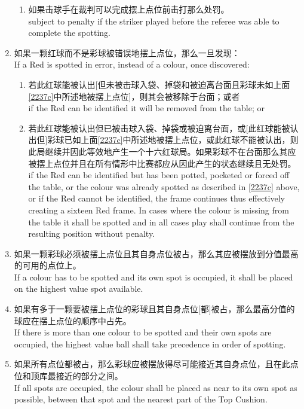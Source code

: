 \begin{enumerate}[label=(\alph*)]
\begin{enumerate}[label=(\roman*)]
        \item 如果击球手在裁判可以完成摆上点位前击打那么处罚。\\
        subject to penalty if the striker played before the referee was able to complete the spotting.
    \end{enumerate}
    \item 如果一颗红球而不是彩球被错误地摆上点位，那么一旦发现：\\
    If a Red is spotted in error, instead of a colour, once discovered:
    \begin{enumerate}[label=(\roman*)]
        \item 若此红球能被认出[但未被击球入袋、掉袋和被迫离台面且彩球未如上面\ref{2237c}中所述地被摆上点位]，则其会被移除于台面；或者\\
        if the Red can be identified it will be removed from the table; or
        \item 若此红球能被认出但已被击球入袋、掉袋或被迫离台面，或[此红球能被认出但]彩球已如上面\ref{2237c}中所述地被摆上点位，或此红球不能被认出，则此局继续并因此等效地产生一个十六红球局。如果彩球不在台面那么其应被摆上点位并且在所有情形中比赛都应从因此产生的状态继续且无处罚。\\
        if the Red can be identified but has been potted, pocketed or forced off the table, or the colour was already spotted as described in \ref{2237c} above, or if the Red cannot be identified, the frame continues thus effectively creating a sixteen Red frame. In cases where the colour is missing from the table it shall be spotted and in all cases play shall continue from the resulting position without penalty.
    \end{enumerate}
    \item 如果一颗彩球必须被摆上点位且其自身点位被占，那么其应被摆放到分值最高的可用的点位上。\\
    If a colour has to be spotted and its own spot is occupied, it shall be placed on the highest value spot available.
    \item 如果有多于一颗要被摆上点位的彩球且其自身点位[都]被占，那么最高分值的球应在摆上点位的顺序中占先。\\
    If there is more than one colour to be spotted and their own spots are occupied, the highest value ball shall take precedence in order of spotting.
    \item 如果所有点位都被占，那么彩球应被摆放得尽可能接近其自身点位，且在此点位和顶库最接近的部分之间。\\
    If all spots are occupied, the colour shall be placed as near to its own spot as possible, between that spot and the nearest part of the Top Cushion.

\end{enumerate}
